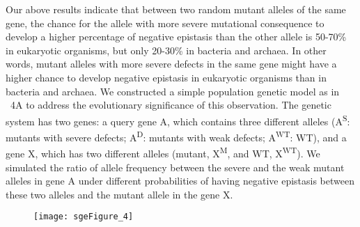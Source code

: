 Our above results indicate that between two random mutant alleles of
the same gene, the chance for the allele with more severe mutational
consequence to develop a higher percentage of negative epistasis than
the other allele is 50-70\% in eukaryotic organisms, but only 20-30\% in
bacteria and archaea. In other words, mutant alleles with more severe
defects in the same gene might have a higher chance to develop
negative epistasis in eukaryotic organisms than in bacteria and
archaea. We constructed a simple population genetic model as in
\Fig~4A to address the evolutionary significance of this
observation. The genetic system has two genes: a query gene A, which
contains three different alleles (A\textsuperscript{S}: mutants with
severe defects; A\textsuperscript{D}: mutants with weak defects;
A\textsuperscript{WT}: WT), and a gene X, which has two different
alleles (mutant, X\textsuperscript{M}, and WT,
X\textsuperscript{WT}). We simulated the ratio of allele frequency
between the severe and the weak mutant alleles in
gene A under different probabilities of having negative epistasis
between these two alleles and the mutant allele in the gene X.

\label{fig:popgenPurging}

\begin{figure}[H]
\centering
\texttt{[image: sgeFigure\_4]}
\end{figure}

